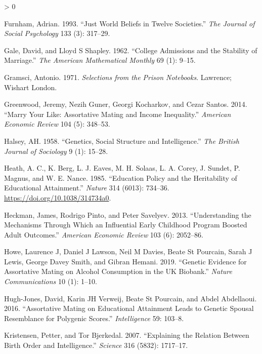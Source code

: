 \documentclass[
]{article}
\newlength{\cslhangindent}
\newenvironment{CSLReferences}[2] %
 {%
  \setlength{\parindent}{0pt}
  \ifodd #1 \everypar{\setlength{\hangindent}{\cslhangindent}}\ignorespaces\fi
  \ifnum #2 > 0
  \setlength{\parskip}{#2\baselineskip}
  \fi
 }%
 {}
\begin{document}
\begin{CSLReferences}{1}{0}
\leavevmode\hypertarget{ref-furnham1993just}{}%
Furnham, Adrian. 1993. {``Just World Beliefs in Twelve Societies.''} \emph{The Journal of Social Psychology} 133 (3): 317--29.

\leavevmode\hypertarget{ref-gale1962college}{}%
Gale, David, and Lloyd S Shapley. 1962. {``College Admissions and the Stability of Marriage.''} \emph{The American Mathematical Monthly} 69 (1): 9--15.

\leavevmode\hypertarget{ref-gramsci1971selections}{}%
Gramsci, Antonio. 1971. \emph{Selections from the Prison Notebooks}. Lawrence; Wishart London.

\leavevmode\hypertarget{ref-greenwood2014marry}{}%
Greenwood, Jeremy, Nezih Guner, Georgi Kocharkov, and Cezar Santos. 2014. {``Marry Your Like: Assortative Mating and Income Inequality.''} \emph{American Economic Review} 104 (5): 348--53.

\leavevmode\hypertarget{ref-halsey1958genetics}{}%
Halsey, AH. 1958. {``Genetics, Social Structure and Intelligence.''} \emph{The British Journal of Sociology} 9 (1): 15--28.

\leavevmode\hypertarget{ref-Heath_1985}{}%
Heath, A. C., K. Berg, L. J. Eaves, M. H. Solaas, L. A. Corey, J. Sundet, P. Magnus, and W. E. Nance. 1985. {``Education Policy and the Heritability of Educational Attainment.''} \emph{Nature} 314 (6013): 734--36. \url{https://doi.org/10.1038/314734a0}.

\leavevmode\hypertarget{ref-heckman2013understanding}{}%
Heckman, James, Rodrigo Pinto, and Peter Savelyev. 2013. {``Understanding the Mechanisms Through Which an Influential Early Childhood Program Boosted Adult Outcomes.''} \emph{American Economic Review} 103 (6): 2052--86.

\leavevmode\hypertarget{ref-howe2019genetic}{}%
Howe, Laurence J, Daniel J Lawson, Neil M Davies, Beate St Pourcain, Sarah J Lewis, George Davey Smith, and Gibran Hemani. 2019. {``Genetic Evidence for Assortative Mating on Alcohol Consumption in the UK Biobank.''} \emph{Nature Communications} 10 (1): 1--10.

\leavevmode\hypertarget{ref-hugh2016assortative}{}%
Hugh-Jones, David, Karin JH Verweij, Beate St Pourcain, and Abdel Abdellaoui. 2016. {``Assortative Mating on Educational Attainment Leads to Genetic Spousal Resemblance for Polygenic Scores.''} \emph{Intelligence} 59: 103--8.

\leavevmode\hypertarget{ref-kristensen2007explaining}{}%
Kristensen, Petter, and Tor Bjerkedal. 2007. {``Explaining the Relation Between Birth Order and Intelligence.''} \emph{Science} 316 (5832): 1717--17.


\end{CSLReferences}
\end{document}
